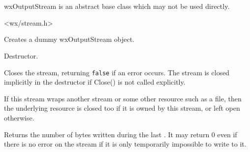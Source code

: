 \section{}\label{wxoutputstream}

wxOutputStream is an abstract base class which may not be used directly.




<wx/stream.h>



\label{wxoutputstreamctor}


Creates a dummy wxOutputStream object.


\label{wxoutputstreamdtor}


Destructor.


\label{wxoutputstreamclose}


Closes the stream, returning {\tt false} if an error occurs. The
stream is closed implicitly in the destructor if Close() is not
called explicitly.

If this stream wraps another stream or some other resource such
as a file, then the underlying resource is closed too if it is owned
by this stream, or left open otherwise.


\label{wxoutputstreamlastwrite}


Returns the number of bytes written during the last 
. It may return $0$ even if there is no
error on the stream if it is only temporarily impossible to write to it.


\label{wxoutputstreamputc}

